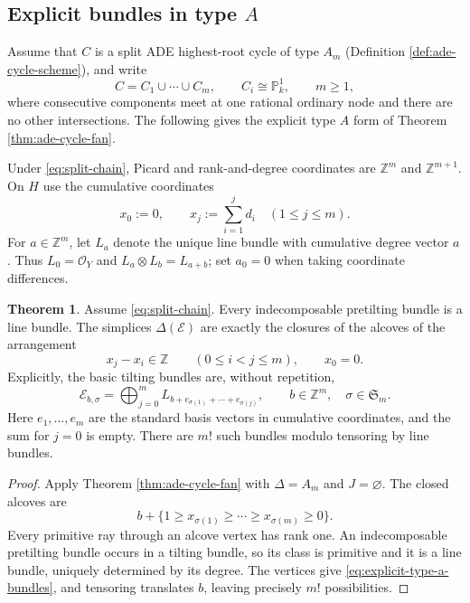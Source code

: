\documentclass[a4paper,reqno]{amsart}
\def\E{\mathcal{E}}
\def\O{\mathcal{O}}
\theoremstyle{definition}
\newtheorem{Thm}{Theorem}[section]
\begin{document}
\subsection{Explicit bundles in type \texorpdfstring{$A$}{A}}\label{sec:type-a}

Assume that $C$ is a split ADE highest-root cycle of type $A_m$ (Definition \ref{def:ade-cycle-scheme}), and write
\begin{equation}\label{eq:split-chain}
C=C_1\cup\cdots\cup C_m,\qquad C_i\cong\mathbb P^1_k,\qquad m\ge1,
\end{equation}
where consecutive components meet at one rational ordinary node and there are no other intersections. The following gives the explicit type $A$ form of Theorem \ref{thm:ade-cycle-fan}.

Under \eqref{eq:split-chain}, Picard and rank-and-degree coordinates are $\mathbb Z^m$ and $\mathbb Z^{m+1}$. On $H$ use the cumulative coordinates
\begin{equation}\label{eq:type-a-coordinates}
x_0:=0,\qquad x_j:=\sum_{i=1}^j d_i\quad(1\le j\le m).
\end{equation}
For $a\in\mathbb Z^m$, let $L_a$ denote the unique line bundle with cumulative degree vector $a$. Thus $L_0=\O_Y$ and $L_a\otimes L_b=L_{a+b}$; set $a_0=0$ when taking coordinate differences.

\begin{Thm}\label{thm:type-a-classification}
Assume \eqref{eq:split-chain}. Every indecomposable pretilting bundle is a line bundle. The simplices $\Delta(\E)$ are exactly the closures of the alcoves of the arrangement
\begin{equation}\label{eq:affine-a-arrangement}
x_j-x_i\in\mathbb Z\qquad(0\le i<j\le m),\qquad x_0=0.
\end{equation}
Explicitly, the basic tilting bundles are, without repetition,
\begin{equation}\label{eq:explicit-type-a-bundles}
\E_{b,\sigma}=\bigoplus_{j=0}^m
L_{b+e_{\sigma(1)}+\cdots+e_{\sigma(j)}},
\qquad b\in\mathbb Z^m,\quad\sigma\in\mathfrak S_m.
\end{equation}
Here $e_1,\ldots,e_m$ are the standard basis vectors in cumulative coordinates, and the sum for $j=0$ is empty. There are $m!$ such bundles modulo tensoring by line bundles.
\end{Thm}
\begin{proof}
Apply Theorem \ref{thm:ade-cycle-fan} with $\Delta=A_m$ and $J=\varnothing$. The closed alcoves are
\[
b+\{1\ge x_{\sigma(1)}\ge\cdots\ge x_{\sigma(m)}\ge0\}.
\]
Every primitive ray through an alcove vertex has rank one. An indecomposable pretilting bundle occurs in a tilting bundle, so its class is primitive and it is a line bundle, uniquely determined by its degree. The vertices give \eqref{eq:explicit-type-a-bundles}, and tensoring translates $b$, leaving precisely $m!$ possibilities.
\end{proof}
\end{document}

